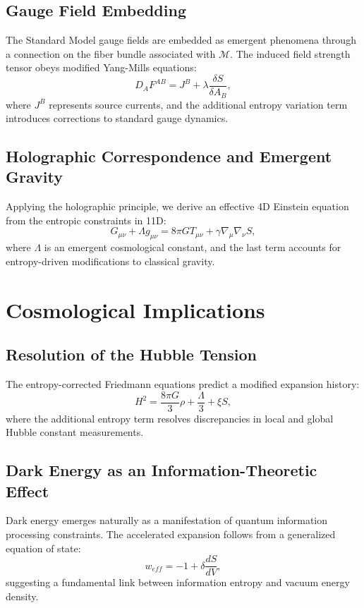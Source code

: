\documentclass{article}
\begin{document}
\subsection{Gauge Field Embedding}
The Standard Model gauge fields are embedded as emergent phenomena through a connection on the fiber bundle associated with $\mathcal{M}$. The induced field strength tensor obeys modified Yang-Mills equations:
\begin{equation}
D_A F^{AB} = J^B + \lambda \frac{\delta S}{\delta A_B},
\end{equation}
where $J^B$ represents source currents, and the additional entropy variation term introduces corrections to standard gauge dynamics.

\subsection{Holographic Correspondence and Emergent Gravity}
Applying the holographic principle, we derive an effective 4D Einstein equation from the entropic constraints in 11D:
\begin{equation}
G_{\mu\nu} + \Lambda g_{\mu\nu} = 8\pi G T_{\mu\nu} + \gamma \nabla_\mu \nabla_\nu S,
\end{equation}
where $\Lambda$ is an emergent cosmological constant, and the last term accounts for entropy-driven modifications to classical gravity.

\section{Cosmological Implications}

\subsection{Resolution of the Hubble Tension}
The entropy-corrected Friedmann equations predict a modified expansion history:
\begin{equation}
H^2 = \frac{8\pi G}{3} \rho + \frac{\Lambda}{3} + \xi S,
\end{equation}
where the additional entropy term resolves discrepancies in local and global Hubble constant measurements.

\subsection{Dark Energy as an Information-Theoretic Effect}
Dark energy emerges naturally as a manifestation of quantum information processing constraints. The accelerated expansion follows from a generalized equation of state:
\begin{equation}
w_{eff} = -1 + \delta \frac{dS}{dV},
\end{equation}
suggesting a fundamental link between information entropy and vacuum energy density.
\end{document}
